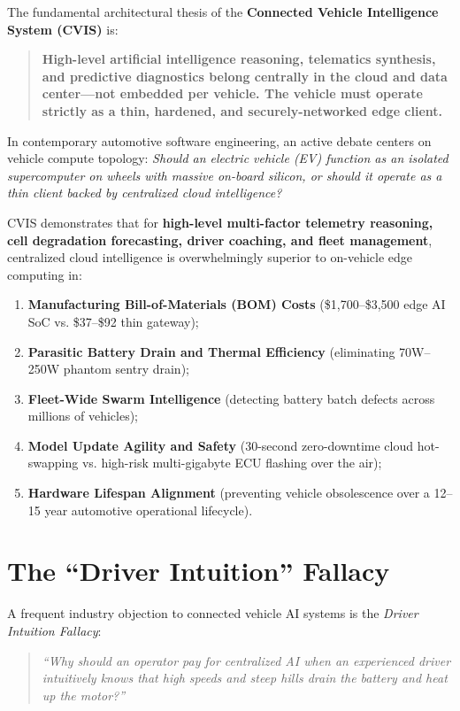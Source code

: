\documentclass[12pt,a4paper]{report}
\begin{document}
The fundamental architectural thesis of the \textbf{Connected Vehicle Intelligence System (CVIS)} is:
\begin{quote}
\textbf{High-level artificial intelligence reasoning, telematics synthesis, and predictive diagnostics belong centrally in the cloud and data center---not embedded per vehicle. The vehicle must operate strictly as a thin, hardened, and securely-networked edge client.}
\end{quote}

In contemporary automotive software engineering, an active debate centers on vehicle compute topology: \textit{Should an electric vehicle (EV) function as an isolated supercomputer on wheels with massive on-board silicon, or should it operate as a thin client backed by centralized cloud intelligence?}

CVIS demonstrates that for \textbf{high-level multi-factor telemetry reasoning, cell degradation forecasting, driver coaching, and fleet management}, centralized cloud intelligence is overwhelmingly superior to on-vehicle edge computing in:
\begin{enumerate}[leftmargin=1.5cm]
  \item \textbf{Manufacturing Bill-of-Materials (BOM) Costs} (\$1,700--\$3,500 edge AI SoC vs. \$37--\$92 thin gateway);
  \item \textbf{Parasitic Battery Drain and Thermal Efficiency} (eliminating 70W--250W phantom sentry drain);
  \item \textbf{Fleet-Wide Swarm Intelligence} (detecting battery batch defects across millions of vehicles);
  \item \textbf{Model Update Agility and Safety} (30-second zero-downtime cloud hot-swapping vs. high-risk multi-gigabyte ECU flashing over the air);
  \item \textbf{Hardware Lifespan Alignment} (preventing vehicle obsolescence over a 12--15 year automotive operational lifecycle).
\end{enumerate}

\section{The ``Driver Intuition'' Fallacy}

A frequent industry objection to connected vehicle AI systems is the \textit{Driver Intuition Fallacy}:
\begin{quote}
\textit{``Why should an operator pay for centralized AI when an experienced driver intuitively knows that high speeds and steep hills drain the battery and heat up the motor?''}
\end{quote}
\end{document}
